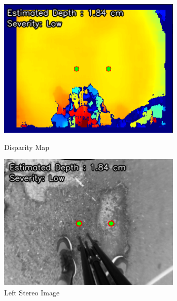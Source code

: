 \begin{figure}[htbp]
	\centering
	\begin{minipage}{0.32\textwidth}
		\centering
		\includegraphics[width=\textwidth]{pothole disparity.png}
		\caption{Disparity Map}
		\label{fig:image1}
	\end{minipage}
	\hfill
	\begin{minipage}{0.32\textwidth}
		\centering
		\includegraphics[width=\textwidth]{pothole raw left.png}
		\caption{Left Stereo Image}
		\label{fig:image2}
	\end{minipage}
	\hfill
	\begin{minipage}{0.32\textwidth}
		\centering

\end{minipage}
\end{figure}
